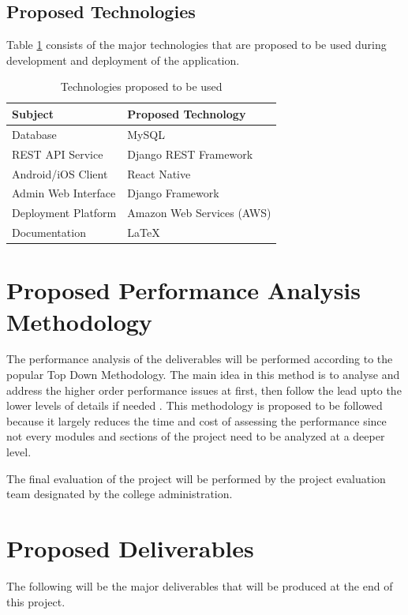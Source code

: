 \documentclass[12pt, a4paper, oneside]{article}
\begin{document}
\subsection{Proposed Technologies}
Table \ref{table:tech} consists of the major technologies that are proposed to be used during development and deployment of the application.

\renewcommand{\arraystretch}{1.5}
\begin{table}[h!]
\centering
\begin{tabular}{|l|l|}
\hline
\rowcolor[HTML]{C0C0C0} 
\textbf{Subject}    & \textbf{Proposed Technology} \\ \hline
Database            & MySQL                        \\ \hline
REST API Service    & Django REST Framework        \\ \hline
Android/iOS Client  & React Native                 \\ \hline
Admin Web Interface & Django Framework             \\ \hline
Deployment Platform & Amazon Web Services (AWS)    \\ \hline
Documentation & LaTeX \\ \hline
\end{tabular}
\caption{Technologies proposed to be used}
\label{table:tech}
\end{table}

\break
\section{Proposed Performance Analysis Methodology}
The performance analysis of the deliverables will be performed according to the popular Top Down Methodology. The main idea in this method is to analyse and address the higher order performance issues at first, then follow the lead upto the lower levels of details if needed \cite{tdmethod}. This methodology is proposed to be followed because it largely reduces the time and cost of assessing the performance since not every modules and sections of the project need to be analyzed at a deeper level.

The final evaluation of the project will be performed by the project evaluation team designated by the college administration.

\newpage
\newpage
\section{Proposed Deliverables}
The following will be the major deliverables that will be produced at the end of this project.
\end{document}
